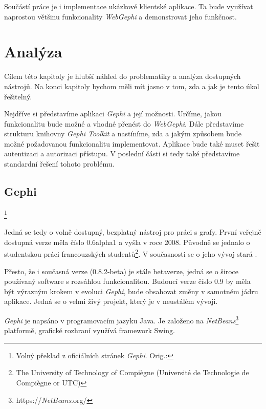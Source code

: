 \documentclass[thesis=M,czech]{FITthesis}[2014/05/6]
\begin{document}
Součástí práce je i implementace ukázkové klientské aplikace. Ta bude využívat naprostou většinu funkcionality \textit{WebGephi} a demonstrovat jeho funkčnost.


\chapter{Analýza}
Cílem této kapitoly je hlubší náhled do problematiky a analýza dostupných nástrojů. Na konci kapitoly bychom měli mít jasno v tom, zda a jak je tento úkol řešitelný.

Nejdříve si představíme aplikaci \textit{Gephi} a její možnosti. Určíme, jakou funkcionalitu bude možné a vhodné přenést do \textit{WebGephi}. Dále představíme strukturu knihovny \textit{Gephi Toolkit}
a nastíníme, zda a jakým způsobem bude možné požadovanou funkcionalitu implementovat. Aplikace bude také muset řešit autentizaci a autorizaci přístupu. V poslední části si tedy také představíme
standardní řešení tohoto problému.

\section{Gephi}
\footnote{Volný překlad z oficiálních stránek \textit{Gephi}\cite{gephi}. Orig.: }

Jedná se tedy o volně dostupný, bezplatný nástroj pro práci s grafy. První veřejně dostupná verze měla číslo 0.6alpha1 a vyšla v roce 2008.
Původně se jednalo o studentskou práci francouzských studentů\footnote{The
University of Technology of Compiègne (Université de Technologie de Compiègne or
UTC)}. V současnosti se o jeho vývoj stará \cite{gephi:consortium}.

Přesto, že i současná verze (0.8.2-beta) je stále betaverze, jedná se o široce
používaný software s rozsáhlou funkcionalitou. Budoucí verze číslo 0.9 by měla být výrazným krokem v evoluci \textit{Gephi}, bude obsahovat změny v samotném jádru aplikace.
Jedná se o velmi živý projekt, který je v neustálém vývoji.

\textit{Gephi} je napsáno v programovacím jazyku Java. Je založeno na \textit{NetBeans}\footnote{https://\textit{NetBeans}.org/} platformě, grafické rozhraní využívá framework Swing.  
\end{document}
